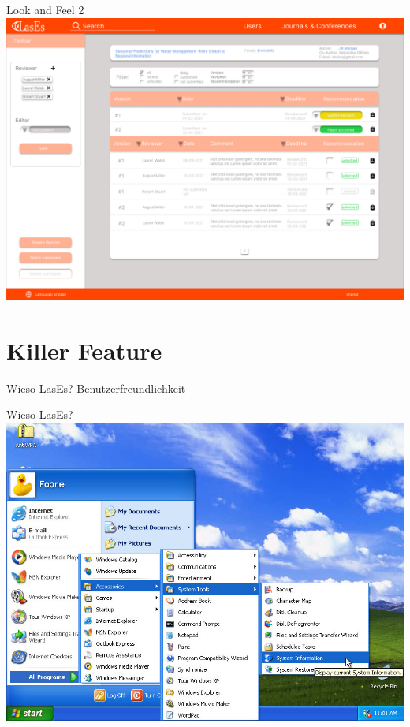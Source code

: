 \documentclass{beamer}
\begin{document}
\begin{frame}{Look and Feel 2}
	\centering
	\includegraphics[height=0.9\textheight]{../../docs/Pflichtenheft/graphics/Submission-png}
\end{frame}

\section{Killer Feature}
\begin{frame}{Wieso LasEs?}
	\centering
	\pause
	\huge Benutzerfreundlichkeit
\end{frame}

\begin{frame}{Wieso LasEs?}
	\centering
	\includegraphics[height=0.8\textheight]{graphics/windowsxp}
\end{frame}
\end{document}
